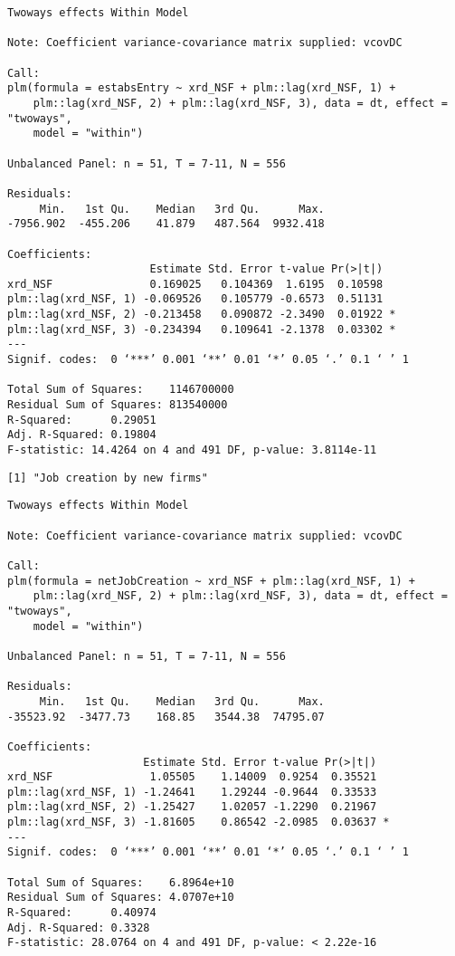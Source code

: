\documentclass[11pt]{article}
\begin{document}
    
    \begin{verbatim}
Twoways effects Within Model

Note: Coefficient variance-covariance matrix supplied: vcovDC

Call:
plm(formula = estabsEntry ~ xrd_NSF + plm::lag(xrd_NSF, 1) + 
    plm::lag(xrd_NSF, 2) + plm::lag(xrd_NSF, 3), data = dt, effect = "twoways", 
    model = "within")

Unbalanced Panel: n = 51, T = 7-11, N = 556

Residuals:
     Min.   1st Qu.    Median   3rd Qu.      Max. 
-7956.902  -455.206    41.879   487.564  9932.418 

Coefficients:
                      Estimate Std. Error t-value Pr(>|t|)  
xrd_NSF               0.169025   0.104369  1.6195  0.10598  
plm::lag(xrd_NSF, 1) -0.069526   0.105779 -0.6573  0.51131  
plm::lag(xrd_NSF, 2) -0.213458   0.090872 -2.3490  0.01922 *
plm::lag(xrd_NSF, 3) -0.234394   0.109641 -2.1378  0.03302 *
---
Signif. codes:  0 ‘***’ 0.001 ‘**’ 0.01 ‘*’ 0.05 ‘.’ 0.1 ‘ ’ 1

Total Sum of Squares:    1146700000
Residual Sum of Squares: 813540000
R-Squared:      0.29051
Adj. R-Squared: 0.19804
F-statistic: 14.4264 on 4 and 491 DF, p-value: 3.8114e-11
    \end{verbatim}

    
    \begin{Verbatim}[commandchars=\\\{\}]
[1] "Job creation by new firms"

    \end{Verbatim}

    
    \begin{verbatim}
Twoways effects Within Model

Note: Coefficient variance-covariance matrix supplied: vcovDC

Call:
plm(formula = netJobCreation ~ xrd_NSF + plm::lag(xrd_NSF, 1) + 
    plm::lag(xrd_NSF, 2) + plm::lag(xrd_NSF, 3), data = dt, effect = "twoways", 
    model = "within")

Unbalanced Panel: n = 51, T = 7-11, N = 556

Residuals:
     Min.   1st Qu.    Median   3rd Qu.      Max. 
-35523.92  -3477.73    168.85   3544.38  74795.07 

Coefficients:
                     Estimate Std. Error t-value Pr(>|t|)  
xrd_NSF               1.05505    1.14009  0.9254  0.35521  
plm::lag(xrd_NSF, 1) -1.24641    1.29244 -0.9644  0.33533  
plm::lag(xrd_NSF, 2) -1.25427    1.02057 -1.2290  0.21967  
plm::lag(xrd_NSF, 3) -1.81605    0.86542 -2.0985  0.03637 *
---
Signif. codes:  0 ‘***’ 0.001 ‘**’ 0.01 ‘*’ 0.05 ‘.’ 0.1 ‘ ’ 1

Total Sum of Squares:    6.8964e+10
Residual Sum of Squares: 4.0707e+10
R-Squared:      0.40974
Adj. R-Squared: 0.3328
F-statistic: 28.0764 on 4 and 491 DF, p-value: < 2.22e-16
    \end{verbatim}
\end{document}
